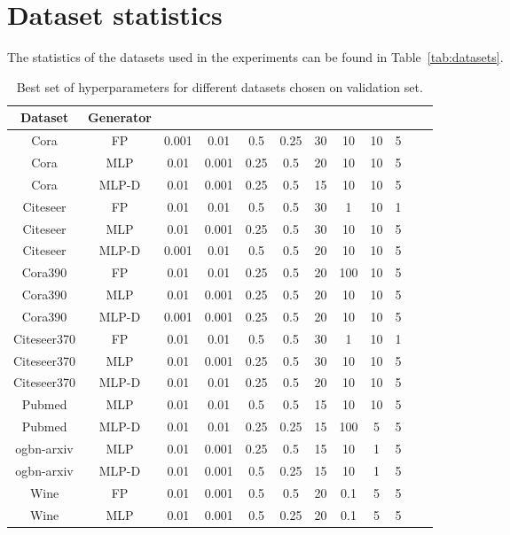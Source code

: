 \documentclass{article}
\begin{document}
\section{Dataset statistics}
The statistics of the datasets used in the experiments can be found in Table~\ref{tab:datasets}.



\begin{table*}
\footnotesize
\caption{Best set of hyperparameters for different datasets chosen on validation set.}
\label{tab:hyperparameters}
\begin{center}
\begin{tabular}{c|c|cccccccccc}
Dataset & Generator&  &  &  &  &  &  &  & \\ \hline
Cora & FP & 0.001 & 0.01 & 0.5 & 0.25& 30 & 10 & 10 & 5\\
Cora & MLP & 0.01 & 0.001 & 0.25 & 0.5 & 20 & 10 & 10 & 5\\
Cora & MLP-D & 0.01 & 0.001 & 0.25 & 0.5 & 15 & 10 & 10 & 5\\ \hline
Citeseer & FP & 0.01 & 0.01 & 0.5 & 0.5 & 30 & 1 & 10 & 1\\
Citeseer & MLP & 0.01 & 0.001 & 0.25 & 0.5 & 30 & 10 & 10 & 5\\
Citeseer & MLP-D & 0.001 & 0.01 & 0.5 & 0.5 & 20 & 10 & 10 & 5\\ \hline
Cora390 & FP & 0.01 & 0.01 & 0.25 & 0.5 & 20 & 100 & 10 & 5\\
Cora390 & MLP & 0.01 & 0.001 & 0.25 & 0.5 & 20 & 10 & 10 & 5\\
Cora390 & MLP-D & 0.001 & 0.001 & 0.25 & 0.5 & 20 & 10 & 10 & 5\\ \hline
Citeseer370 & FP & 0.01 & 0.01 & 0.5 & 0.5 & 30 & 1 & 10 & 1\\
Citeseer370 & MLP & 0.01 & 0.001 & 0.25 & 0.5 & 30 & 10 & 10 & 5\\
Citeseer370 & MLP-D & 0.01 & 0.01 & 0.25 & 0.5 & 20 & 10 & 10 & 5\\ \hline
Pubmed & MLP & 0.01 & 0.01 & 0.5 & 0.5 & 15 & 10 & 10 & 5\\
Pubmed & MLP-D & 0.01 & 0.01 & 0.25 & 0.25 & 15 & 100 & 5 & 5\\ \hline
ogbn-arxiv & MLP & 0.01 & 0.001 & 0.25 & 0.5 & 15 & 10 & 1 & 5\\
ogbn-arxiv & MLP-D & 0.01 & 0.001 & 0.5 & 0.25 & 15 & 10 & 1 & 5\\ \hline
Wine & FP & 0.01 & 0.001 & 0.5 & 0.5 & 20 & 0.1 & 5 & 5\\
Wine & MLP & 0.01 & 0.001 & 0.5 & 0.25 & 20 & 0.1 & 5 & 5\\

\end{tabular}
\end{center}
\end{table*}
\end{document}
